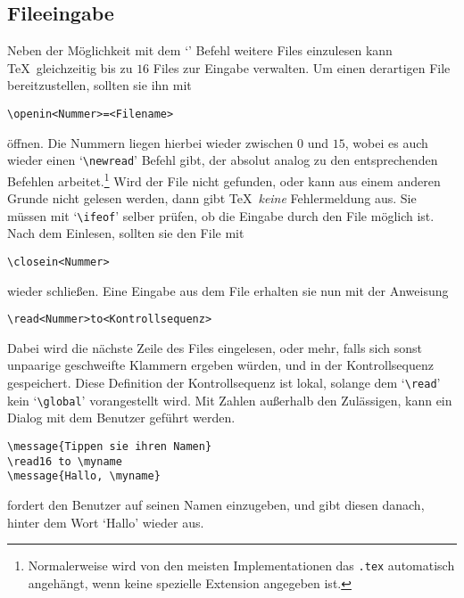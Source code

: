 \subsection{Fileeingabe}
Neben der M\"oglichkeit mit dem 
`\verb||' Befehl weitere Files
einzulesen kann \TeX\ gleichzeitig bis zu $16$ Files zur Eingabe
verwalten. Um einen derartigen File bereitzustellen, sollten sie ihn
mit
\begin{verbatim}
\openin<Nummer>=<Filename>
\end{verbatim}
\"offnen. Die Nummern liegen hierbei wieder zwischen $0$ und $15$, wobei
es auch wieder einen 
`\verb|\newread|' Befehl gibt, der absolut analog
zu den entsprechenden Befehlen arbeitet.\footnote{Normalerweise wird
von den meisten Implementationen das {\tt .tex} automatisch angeh\"angt,
wenn keine spezielle 
Extension angegeben ist.} Wird der File nicht
gefunden, oder kann aus einem anderen Grunde nicht gelesen werden,
dann gibt \TeX\ {\em keine} 
Fehlermeldung aus. Sie m\"ussen mit
`\verb|\ifeof|' selber pr\"ufen, ob die Eingabe durch den File m\"oglich
ist. Nach dem Einlesen, sollten sie den File mit
\begin{verbatim}
\closein<Nummer>
\end{verbatim}
wieder schlie\ss{}en. Eine Eingabe aus dem File erhalten sie nun mit der
Anweisung
\begin{verbatim}
\read<Nummer>to<Kontrollsequenz>
\end{verbatim}
Dabei wird die n\"achste Zeile des Files eingelesen, oder mehr, falls
sich sonst unpaarige geschweifte 
Klammern ergeben w\"urden, und in der
Kontrollsequenz gespeichert. Diese Definition der Kontrollsequenz ist
lokal, solange dem `\verb|\read|' kein 
`\verb|\global|' vorangestellt
wird. Mit Zahlen au\ss{}erhalb den Zul\"assigen, kann ein Dialog mit dem
Benutzer gef\"uhrt werden.
\begin{verbatim}
\message{Tippen sie ihren Namen}
\read16 to \myname
\message{Hallo, \myname}
\end{verbatim}
fordert den Benutzer auf seinen Namen einzugeben, und gibt diesen
danach, hinter dem Wort `Hallo' wieder aus.
